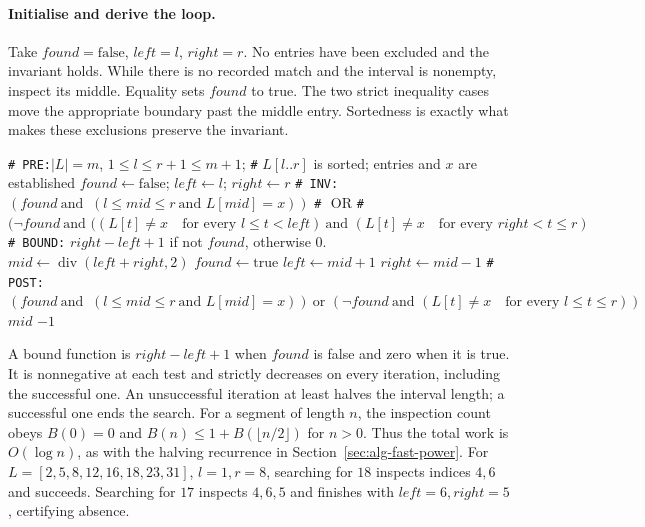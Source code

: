 \paragraph{Initialise and derive the loop.}
Take $found=\mathrm{false}$, $left=l$, $right=r$. No entries have been
excluded and the invariant holds. While there is no recorded match and the interval is nonempty,
inspect its middle. Equality sets $found$ to true. The two strict inequality
cases move the appropriate boundary past the middle entry. Sortedness is
exactly what makes these exclusions preserve the invariant.

\begin{algorithm}[H]
\begin{algorithmic}[1]
\Statex \texttt{\# PRE:}$|L|=m$, $1\leq l\leq r+1\leq m+1$;
\Statex \texttt{\#} $L[l..r]$ is sorted; entries and $x$ are established
\State $found\leftarrow\mathrm{false}$; $left\leftarrow l$; $right\leftarrow r$
\Statex \texttt{\# INV:}  $(found\ \text{and }\ (l\leq mid\leq r\ \text{and }L[mid]=x))$
\Statex \texttt{\#} $\text{              OR} $
\Statex \texttt{\#} $(\neg found\ \text{and } ((L[t]\ne x\quad\text{for every }l\leq t< left)\ \text{and } (L[t]\ne x\quad\text{for every }right <  t \leq r)$ 
\Statex \texttt{\# BOUND:} $right-left+1$ if not $found$, otherwise $0$.
\State $mid\leftarrow\operatorname{div}(left+right,2)$
\State $found\leftarrow\mathrm{true}$
\State $left\leftarrow mid+1$
\Else
\State $right\leftarrow mid-1$
\EndIf
\EndWhile
\Statex \texttt{\# POST:} $(found\ \text{and }\ (l\leq mid\leq r\ \text{and }L[mid]=x))\ \text{or } (\neg found\ \text{and } (L[t]\ne x\quad\text{for every }l\leq t \leq r))$
\State \Return $mid$
\Else
\State \Return $-1$
\EndIf
\EndProcedure
\end{algorithmic}
\caption{Bracket every possible match between two moving boundaries.}
\end{algorithm}

A bound function is $right-left+1$ when $found$ is false and zero
when it is true. It is nonnegative at each test and strictly decreases
on every iteration, including the successful one.
An unsuccessful iteration at least halves the interval length; a successful
one ends the search. For a segment of length $n$, the inspection count obeys
$B(0)=0$ and $B(n)\leq1+B(\lfloor n/2\rfloor)$ for $n>0$.
Thus the total work is $O(\log{n})$, as with the halving recurrence
in Section~\ref{sec:alg-fast-power}.
For $L=[2,5,8,12,16,18,23,31]$, $l=1,r=8$, searching for $18$ inspects
indices $4,6$ and succeeds. Searching for $17$ inspects $4,6,5$ and
finishes with $left=6,right=5$, certifying absence.



